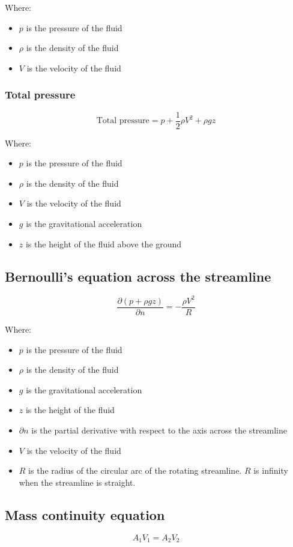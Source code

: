 \documentclass[11pt]{article}
\begin{document}
Where:
\begin{itemize}
\item \(p\) is the pressure of the fluid
\item \(\rho\) is the density of the fluid
\item \(V\) is the velocity of the fluid
\end{itemize}

\newpage

\subsubsection{Total pressure}
\label{sec:orgc0ea275}
\[\text{Total pressure} = p + \frac{1}{2} \rho V^2 + \rho g z\]

Where:
\begin{itemize}
\item \(p\) is the pressure of the fluid
\item \(\rho\) is the density of the fluid
\item \(V\) is the velocity of the fluid
\item \(g\) is the gravitational acceleration
\item \(z\) is the height of the fluid above the ground
\end{itemize}

\subsection{Bernoulli's equation across the streamline}
\label{sec:orgbc40598}
\[\frac{\partial \left(p + \rho g z \right)}{\partial n} = - \frac{\rho V^2}{R}\]

Where:
\begin{itemize}
\item \(p\) is the pressure of the fluid
\item \(\rho\) is the density of the fluid
\item \(g\) is the gravitational acceleration
\item \(z\) is the height of the fluid
\item \(\partial n\) is the partial derivative with respect to the axis across the streamline
\item \(V\) is the velocity of the fluid
\item \(R\) is the radius of the circular arc of the rotating streamline. \(R\) is infinity when the streamline is straight.
\end{itemize}

\subsection{Mass continuity equation}
\label{sec:orgd5372ae}
\[A_1 V_1 = A_2 V_2\]
\end{document}

